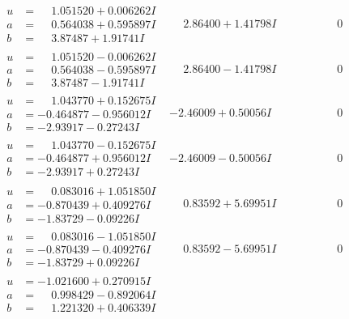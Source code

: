 \documentclass[1p]{elsarticle_modified}
\theoremstyle{definition}
\begin{document}
$$\begin{array}{c|c|c}
\begin{aligned}
u &= \phantom{-}1.051520 + 0.006262 I \\
a &= \phantom{-}0.564038 + 0.595897 I \\
b &= \phantom{-}3.87487 + 1.91741 I\end{aligned}
 & \phantom{-}2.86400 + 1.41798 I & \phantom{-0.000000 } 0 \\ \hline\begin{aligned}
u &= \phantom{-}1.051520 - 0.006262 I \\
a &= \phantom{-}0.564038 - 0.595897 I \\
b &= \phantom{-}3.87487 - 1.91741 I\end{aligned}
 & \phantom{-}2.86400 - 1.41798 I & \phantom{-0.000000 } 0 \\ \hline\begin{aligned}
u &= \phantom{-}1.043770 + 0.152675 I \\
a &= -0.464877 - 0.956012 I \\
b &= -2.93917 - 0.27243 I\end{aligned}
 & -2.46009 + 0.50056 I & \phantom{-0.000000 } 0 \\ \hline\begin{aligned}
u &= \phantom{-}1.043770 - 0.152675 I \\
a &= -0.464877 + 0.956012 I \\
b &= -2.93917 + 0.27243 I\end{aligned}
 & -2.46009 - 0.50056 I & \phantom{-0.000000 } 0 \\ \hline\begin{aligned}
u &= \phantom{-}0.083016 + 1.051850 I \\
a &= -0.870439 + 0.409276 I \\
b &= -1.83729 - 0.09226 I\end{aligned}
 & \phantom{-}0.83592 + 5.69951 I & \phantom{-0.000000 } 0 \\ \hline\begin{aligned}
u &= \phantom{-}0.083016 - 1.051850 I \\
a &= -0.870439 - 0.409276 I \\
b &= -1.83729 + 0.09226 I\end{aligned}
 & \phantom{-}0.83592 - 5.69951 I & \phantom{-0.000000 } 0 \\ \hline\begin{aligned}
u &= -1.021600 + 0.270915 I \\
a &= \phantom{-}0.998429 - 0.892064 I \\
b &= \phantom{-}1.221320 + 0.406339 I\end{aligned}

\end{array}$$
\end{document}
